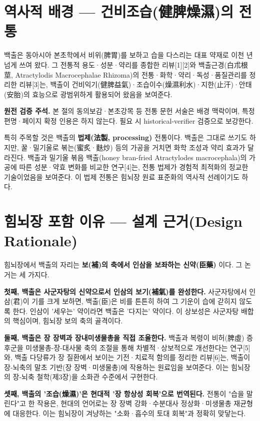 \documentclass[11pt,oneside]{book}
\newenvironment{authnote}
  {\par\smallskip\begingroup\leftskip=7mm\rightskip=5mm\small\color{muted}\noindent\ignorespaces}
  {\par\endgroup\smallskip}
\begin{document}
\section{역사적 배경 — 건비조습(健脾燥濕)의 전통}
백출은 동아시아 본초학에서 비위(脾胃)를 보하고 습을 다스리는 대표 약재로 이천 년 넘게 쓰여 왔다. 그 전통적 용도·성분·약리를 종합한 리뷰[1][2]와 백출근경(白朮根莖, Atractylodis Macrocephalae Rhizoma)의 전통·화학·약리·독성·품질관리를 정리한 리뷰[3]는, 백출이 건비익기(健脾益氣)·조습이수(燥濕利水)·지한(止汗)·안태(安胎)의 효능으로 광범위하게 활용되어 왔음을 보여준다.

\begin{authnote}\textbf{원전 검증 주석.} 본 절의 동의보감·본초강목 등 전통 문헌 서술은 배경 맥락이며, 특정 편명·페이지 확정 인용은 하지 않는다. 필요 시 historical-verifier 검증으로 보강한다.\end{authnote}
특히 주목할 것은 백출의 \textbf{법제(法製, processing)} 전통이다. 백출은 그대로 쓰기도 하지만, 꿀·밀기울로 볶는(蜜炙·麩炒) 등의 가공을 거치면 화학 조성과 약리 효과가 달라진다. 백출과 밀기울 볶음 백출(honey bran-fried Atractylodes macrocephala)의 가공에 따른 성분·약효 변화를 비교한 연구[4]는, 전통 법제가 경험적 최적화의 정교한 기술이었음을 보여준다. 이 법제 전통은 힘뇌장 원료 표준화의 역사적 선례이기도 하다.

\section{힘뇌장 포함 이유 — 설계 근거(Design Rationale)}
힘뇌장에서 백출의 자리는 \textbf{보(補)의 축에서 인삼을 보좌하는 신약(臣藥)} 이다. 그 논거는 세 가지다.

\textbf{첫째, 백출은 사군자탕의 신약으로서 인삼의 보기(補氣)를 완성한다.} 사군자탕에서 인삼(君)이 기를 크게 보하면, 백출(臣)은 비를 튼튼히 하여 그 기운이 습에 갇히지 않도록 한다. 인삼이 '세우는' 약이라면 백출은 '다지는' 약이다. 이 상보성은 사군자탕 배합의 핵심이며, 힘뇌장 보의 축의 골격이다.

\textbf{둘째, 백출은 장 장벽과 장내미생물총을 직접 조율한다.} 백출과 복령이 비허(脾虛) 증후군을 미생물총-장-대사물 축의 조절을 통해 차별적·상보적으로 개선한다는 연구[5]와, 백출 다당류가 장 질환에서 보이는 기전·치료적 함의를 정리한 리뷰[6]는, 백출이 장-뇌축의 말초 기반(장 장벽·미생물총)에 작용하는 원료임을 보여준다. 이는 힘뇌장의 장-뇌축 철학(제3장)을 소화관 수준에서 구현한다.

\textbf{셋째, 백출의 '조습(燥濕)'은 현대적 '장 항상성 회복'으로 번역된다.} 전통이 "습을 말린다"고 한 작용은, 현대의 언어로는 장 장벽 강화·수분대사 정상화·미생물총 재균형에 대응한다. 이는 힘뇌장이 겨냥하는 "소화·흡수의 토대 회복"과 정확히 맞닿는다.
\end{document}
